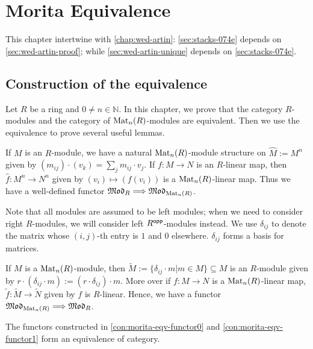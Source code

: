\chapter{Morita Equivalence}\label{chap:morita}

This chapter intertwine with \cref{chap:wed-artin}: \cref{sec:stacks-074e} depends on \cref{sec:wed-artin-proof}; while \cref{sec:wed-artin-unique} depends on \cref{sec:stacks-074e}.

\section{Construction of the equivalence}\label{sec:morita-construction}

Let $R$ be a ring and $0 \ne n\in \mathbb{N}$. In this chapter, we prove that the category $R$-modules and the category of $\operatorname{Mat}_{n}(R)$-modules are equivalent. Then we use the equivalence to prove several useful lemmas.

\begin{construction}\label{con:morita-eqv-functor0}
  \leanok
  If $M$ is an $R$-module, we have a natural $\operatorname{Mat}_{n}(R)$-module structure on $\hat{M}:=M^{n}$ given by $(m_{ij})\cdot (v_{k})=\sum_{j}m_{ij}\cdot v_{j}$.
  If $f : M \to N$ is an $R$-linear map, then $\hat{f} : M^{n}\to N^{n}$ given by $(v_{i}) \mapsto (f(v_{i}))$ is a $\operatorname{Mat}_{n}(R)$-linear map. Thus we have a well-defined functor $\operatorname{\mathfrak{Mod}}_{R} \Longrightarrow \operatorname{\mathfrak{Mod}}_{\operatorname{Mat}_{n}(R)}$.
\end{construction}

Note that all modules are assumed to be left modules; when we need to consider right $R$-modules, we will consider left $R^{\mathsf{opp}}$-modules instead. We use $\delta_{ij}$ to denote the matrix whose $(i,j)$-th entry is $1$ and $0$ elsewhere. $\delta_{ij}$ forms a basis for matrices.

\begin{construction}\label{con:morita-eqv-functor1}
  \leanok
  If $M$ is a $\operatorname{Mat}_{n}(R)$-module, then $\tilde{M} := \{\delta_{ij}\cdot m | m \in M\} \subseteq M$ is an $R$-module given by $r \cdot (\delta_{ij}\cdot m) := (r\cdot \delta_{ij})\cdot m$. More over if $f : M \to N$ is a $\operatorname{Mat}_{n}(R)$-linear map, $\tilde{f} : \tilde{M} \to \tilde{N}$ given by $f$ is $R$-linear. Hence, we have a functor $\operatorname{\mathfrak{Mod}}_{\operatorname{Mat}_{n}(R)}\Longrightarrow \operatorname{\mathfrak{Mod}}_{R}$.
\end{construction}

\begin{theorem}\label{thm:morita}
  The functors constructed in \cref{con:morita-eqv-functor0} and \cref{con:morita-eqv-functor1} form an equivalence of category.
  \leanok
\end{theorem}

